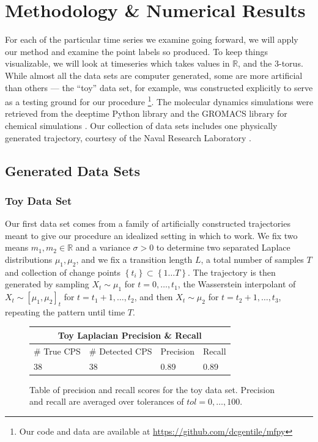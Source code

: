 \documentclass{article}
\newcommand{\R}{\mathbb{R}}
\begin{document}
\section{Methodology \& Numerical Results}
\label{Method and results}
For each of the particular time series we examine going forward, we will apply our method and examine the point labels so produced. To keep things visualizable, we will look at timeseries which takes values in \(\R\), and the \(3\)-torus. While almost all the data sets are computer generated, some are more artificial than others --- the ``toy'' data set, for example, was constructed explicitly to serve as a testing ground for our procedure \footnote{Our code and data are available at \url{https://github.com/dcgentile/mfpy}}. The molecular dynamics simulations were retrieved from the deeptime Python library \cite{hoffmannDeeptimePythonLibrary2021} and the GROMACS library for chemical simulations \cite{abrahamGROMACSHighPerformance2015}. Our collection of data sets includes one physically generated trajectory, courtesy of the Naval Research Laboratory \cite{turgutMeasuredDepthdependenceWaveguide2016}.

\subsection{Generated Data Sets}
\subsubsection{Toy Data Set}
\label{ToyDataSets}
Our first data set comes from a family of artificially constructed trajectories meant to give our procedure an idealized setting in which to work. We fix two means \(m_1, m_2 \in \R\) and a variance \(\sigma > 0\) to determine two separated Laplace distributions \(\mu_1, \mu_{2}\), and we fix a transition length \(L\), a total number of samples \(T\) and collection of change points \(\left\{ t_i \right\} \subset \left\{ 1\dots T \right\}\). The trajectory is then generated by sampling \(X_{t} \sim \mu_1\) for \(t = 0, \dots, t_1\), the Wasserstein interpolant of \(X_t \sim [\mu_1, \mu_2]_{t}\) for \(t = t_1 + 1, \dots, t_2\), and then \(X_t \sim \mu_2\) for \(t = t_2 + 1, \dots, t_3\), repeating the pattern until time \(T\). 

\begin{figure}[htbp]
    \centering
    
\begin{tabular}{ |p{3cm}|p{3cm}|p{3cm}|p{3cm}|  }
 \hline
 \multicolumn{4}{|c|}{Toy Laplacian Precision \& Recall} \\
 \hline
 \# True CPS & \# Detected CPS & Precision & Recall \\
 \hline
 38 & 38 & 0.89 & 0.89 \\
 \hline
\end{tabular}

\caption{Table of precision and recall scores for the toy data set. Precision and recall are averaged over tolerances of \(tol=0,\dots, 100\).}

\label{ToyFTable}
\end{figure}
\end{document}
